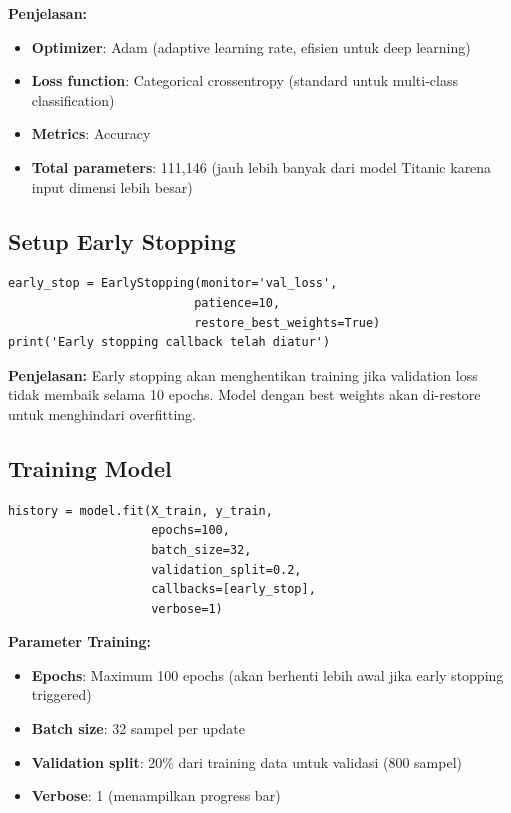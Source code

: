 \documentclass[12pt,a4paper]{article}
\begin{document}
\textbf{Penjelasan:}
\begin{itemize}
    \item \textbf{Optimizer}: Adam (adaptive learning rate, efisien untuk deep learning)
    \item \textbf{Loss function}: Categorical crossentropy (standard untuk multi-class classification)
    \item \textbf{Metrics}: Accuracy
    \item \textbf{Total parameters}: 111,146 (jauh lebih banyak dari model Titanic karena input dimensi lebih besar)
\end{itemize}

\subsection{Setup Early Stopping}

\begin{lstlisting}[caption=Early Stopping Callback]
early_stop = EarlyStopping(monitor='val_loss', 
                          patience=10, 
                          restore_best_weights=True)
print('Early stopping callback telah diatur')
\end{lstlisting}

\textbf{Penjelasan:} Early stopping akan menghentikan training jika validation loss tidak membaik selama 10 epochs. Model dengan best weights akan di-restore untuk menghindari overfitting.

\subsection{Training Model}

\begin{lstlisting}[caption=Training dengan Validation Split]
history = model.fit(X_train, y_train, 
                    epochs=100, 
                    batch_size=32, 
                    validation_split=0.2, 
                    callbacks=[early_stop], 
                    verbose=1)
\end{lstlisting}

\textbf{Parameter Training:}
\begin{itemize}
    \item \textbf{Epochs}: Maximum 100 epochs (akan berhenti lebih awal jika early stopping triggered)
    \item \textbf{Batch size}: 32 sampel per update
    \item \textbf{Validation split}: 20\% dari training data untuk validasi (800 sampel)
    \item \textbf{Verbose}: 1 (menampilkan progress bar)
\end{itemize}
\end{document}
